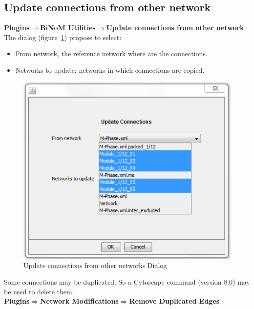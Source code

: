 \subsection{Update connections from other network}
\textbf{Plugins$\Rightarrow$BiNoM Utilities$\Rightarrow$Update connections from other network}\\
The dialog (figure~\ref{Update_connections}) propose to select:
\begin{itemize}
\item From network, the reference network where are the connections.
\item Networks to update: networks in which connections are copied.
\end{itemize}
\begin{figure}[h]
\centering
\includegraphics{graphics/Update_connections}
\caption{Update connections from other networks Dialog}
\label{Update_connections}
\end{figure}
Some connections may be duplicated. So a Cytoscape command (version 8.0) may be used to delete them:\\
\textbf{Plugins$\Rightarrow$Network Modifications$\Rightarrow$Remove Duplicated Edges}

